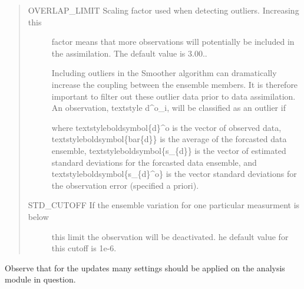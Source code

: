 \documentclass[a4paper,10pt,english]{sphinxmanual}
\begin{document}
\begin{quote}
\begin{description}
\item[{OVERLAP\_LIMIT Scaling factor used when detecting outliers. Increasing this}] \leavevmode
factor means that more observations will potentially be included in the
assimilation. The default value is 3.00..

Including outliers in the Smoother algorithm can dramatically increase the
coupling between the ensemble members. It is therefore important to filter out
these outlier data prior to data assimilation. An observation, textstyle
d\textasciicircum{}o\_i, will be classified as an outlier if

%
\begin{sphinxVerbatim}[commandchars=\\\{\}]
  \PYGZbs{}  \PYGZbs{}\PYGZbs{} \PYGZbs{}  \PYGZbs{}\PYGZbs{}
\end{sphinxVerbatim}

where textstyleboldsymbol\{d\}\textasciicircum{}o is the vector of observed data,
textstyleboldsymbol\{bar\{d\}\} is the average of the forcasted data ensemble,
textstyleboldsymbol\{s\_\{d\}\} is the vector of estimated standard deviations
for the forcasted data ensemble, and textstyleboldsymbol\{s\_\{d\}\textasciicircum{}o\} is the
vector standard deviations for the observation error (specified a priori).

\item[{STD\_CUTOFF If the ensemble variation for one particular measurment is below}] \leavevmode
this limit the observation will be deactivated. he default value for
this cutoff is 1e-6.

\end{description}
\end{quote}

Observe that for the updates many settings should be applied on the analysis
module in question.
\end{document}
